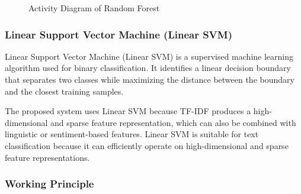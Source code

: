 \documentclass[12pt,a4paper]{report}
\begin{document}
\begin{figure}[H]

\caption{Activity Diagram of Random Forest}
\label{fig:random_forest_activity}
\end{figure}



\subsubsection*{Linear Support Vector Machine (Linear SVM)}

Linear Support Vector Machine (Linear SVM) is a supervised machine learning algorithm used for binary classification. It identifies a linear decision boundary that separates two classes while maximizing the distance between the boundary and the closest training samples.

The proposed system uses Linear SVM because TF-IDF produces a high-dimensional and sparse feature representation, which can also be combined with linguistic or sentiment-based features. Linear SVM is suitable for text classification because it can efficiently operate on high-dimensional and sparse feature representations.

\subsubsection*{Working Principle}
\end{document}
